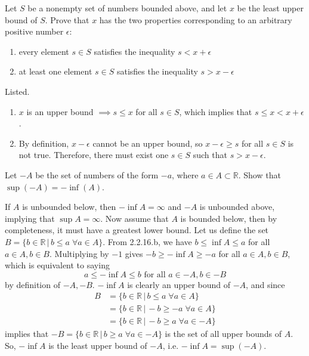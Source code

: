   \begin{exercise}[Olmsted 1.13]
    Let $S$ be a nonempty set of numbers bounded above, and let $x$ be the least upper bound of $S$. Prove that $x$ has the two properties corresponding to an arbitrary positive number $\epsilon$: 
    \begin{enumerate}
      \item every element $s \in S$ satisfies the inequality $s < x + \epsilon$
      \item at least one element $s \in S$ satisfies the inequality $s > x - \epsilon$
    \end{enumerate}
  \end{exercise}
  \begin{solution}
    Listed. 
    \begin{enumerate}
      \item $x$ is an upper bound $\implies s \leq x$ for all $s \in S$, which implies that $s \leq x < x + \epsilon$. 
      \item By definition, $x - \epsilon$ cannot be an upper bound, so $x - \epsilon \geq s$ for all $s \in S$ is not true. Therefore, there must exist one $s \in S$ such that $s > x - \epsilon$. 
    \end{enumerate}
  \end{solution}

  \begin{exercise}[Zorich 2.2.18]
    Let $-A$ be the set of numbers of the form $-a$, where $a \in A \subset \mathbb{R}$. Show that $\sup(-A) = -\inf(A)$. 
  \end{exercise}
  \begin{solution}
    If $A$ is unbounded below, then $-\inf{A} = \infty$ and $-A$ is unbounded above, implying that $\sup{A} = \infty$. Now assume that $A$ is bounded below, then by completeness, it must have a greatest lower bound. Let us define the set $B = \{b \in \mathbb{R} \,|\, b \leq a \; \forall a \in A\}$. From 2.2.16.b, we have $b \leq \inf{A} \leq a$ for all $a \in A, b \in B$. Multiplying by $-1$ gives $-b \geq -\inf{A} \geq -a$ for all $a \in A, b \in B$, which is equivalent to saying 
    \begin{equation}
      a \leq -\inf{A} \leq b \text{ for all } a \in -A, b \in -B
    \end{equation}
    by definition of $-A, -B$. $-\inf{A}$ is clearly an upper bound of $-A$, and since  
    \begin{align*}
      B & = \{b \in \mathbb{R}\,|\, b \leq a \; \forall a \in A\} \\
      & = \{b \in \mathbb{R}\,|\, -b \geq -a \; \forall a \in A\} \\
      & = \{b \in \mathbb{R}\,|\, -b \geq a \; \forall a \in -A\} 
    \end{align*}
    implies that $-B = \{b \in \mathbb{R}\,|\, b \geq a \; \forall a \in -A\}$ is the set of all upper bounds of $A$. So, $-\inf{A}$ is the least upper bound of $-A$, i.e. $-\inf{A} = \sup(-A)$. 
  \end{solution}

